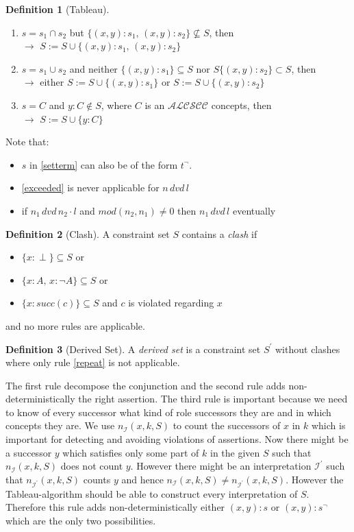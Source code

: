 \documentclass[a4paper,11pt]{scrartcl}
\theoremstyle{break}
\theoremstyle{definition}
\newtheorem{mydef}{Definition}
\begin{document}
\begin{mydef}[Tableau]
\begin{enumerate}
\begin{enumerate}
\item\label{setterm1} $s=s_1\cap s_2$ but $\{(x,y):s_1,\,(x,y):s_2\}\not\subseteq S$, then\\
$\rightarrow$ $S:=S\cup \{(x,y):s_1,\,(x,y):s_2\}$ 
\item\label{setterm2} $s=s_1\cup s_2$ and neither $\{(x,y):s_1\}\subseteq S$ nor $S\{(x,y):s_2\}\subset S$, then\\
$\rightarrow$ either $S:=S\cup \{(x,y):s_1\}$ or $S:=S\cup \{(x,y):s_2\}$ 
\item\label{setterm3} $s=C$ and $y:C\notin S$, where $C$ is an $\mathcal{ALCSCC}$ concepts, then \\
$\rightarrow$ $S:=S\cup\{y:C\}$
\end{enumerate}
\end{enumerate}
\end{mydef}
Note that:
\begin{itemize}
\item $s$ in \ref{setterm} can also be of the form $t^\neg$.
\item \ref{exceeded} is never applicable for $n\, dvd\, l$
\item if  $n_1\,dvd\,n_2\cdot l$ and $mod(n_2,n_1)\neq 0$ then $n_1\,dvd\,l$ eventually
\end{itemize}
\begin{mydef}[Clash]
A constraint set $S$ contains a \textit{clash} if
\begin{itemize}
\item $\{x:\perp\}\subseteq S$ or
\item $\{x:A,\,x:\neg A\}\subseteq S$ or
\item $\{x:succ(c)\}\subseteq S$ and $c$ is violated regarding $x$
\end{itemize}
and no more rules are applicable.
\end{mydef}
\begin{mydef}[Derived Set]
A \textit{derived set} is a constraint set $S^\prime$ without clashes where only rule \ref{repeat} is not applicable.
\end{mydef}
The first rule decompose the conjunction and the second rule adds non-deterministically the right assertion. The third rule is important because we need to know of every successor what kind of role successors they are and in which concepts they are. We use $n_\mathcal{I}(x,k,S)$ to count the successors of $x$ in $k$ which is important for detecting and avoiding violations of assertions. Now there might be a successor $y$ which satisfies only some part of $k$ in the given $S$ such that $n_\mathcal{I}(x,k,S)$ does not count $y$. However there might be an interpretation $\mathcal{I^\prime}$ such that $n_{\mathcal{I}^\prime}(x,k,S)$ counts $y$ and hence $n_{\mathcal{I}}(x,k,S)\neq n_{\mathcal{I}^\prime}(x,k,S)$. However the Tableau-algorithm should be able to construct every interpretation of $S$. Therefore this rule adds non-deterministically either $(x,y):s$ or $(x,y):s^\neg$ which are the only two possibilities.\\ 
\end{document}
